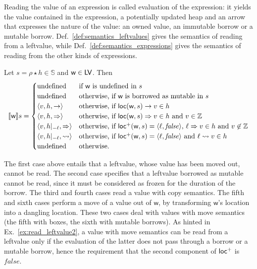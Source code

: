 Reading the value of an expression is called evaluation of the expression: it
yields the value contained in the expression, a potentially updated heap
and an arrow that expresses the nature of the value: an owned value, an immutable borrow
or a mutable borrow. Def.~\ref{def:semantics_leftvalues} gives the semantics of reading from
a leftvalue, while Def.~\ref{def:semantics_expressions} gives the semantics of reading from the other
kinds of expressions.

\begin{definition}\label{def:semantics_leftvalues}
  Let $s=\rho\star h\in\mathbb{S}$ and $\mathsf{w}\in\Leftvalues$. Then
  \[
  \den[\mathsf{w}]{s}=\begin{cases}
  \text{undefined} & \text{if $\mathsf{w}$ is undefined in $s$}\\
  \text{undefined} & \text{otherwise, if $\mathsf{w}$ is borrowed as mutable in $s$}\\
  \langle v, h, \to\rangle & \text{otherwise, if $\loc(\mathsf{w},s)\to v\in h$}\\
  \langle v, h, \Rightarrow\rangle & \text{otherwise, if $\loc(\mathsf{w},s)\Rightarrow v\in h$ and $v\in\mathbb{Z}$}\\
  \langle v, h|_{-\ell}, \Rightarrow\rangle & \text{otherwise, if $\locread(\mathsf{w},s)=\langle\ell,\mathit{false}\rangle$, $\ell\Rightarrow v\in h$ and $v\not\in\mathbb{Z}$}\\
  \langle v, h|_{-\ell}, \leadsto\rangle & \text{otherwise, if $\locread(\mathsf{w},s)=\langle\ell,\mathit{false}\rangle$ and $\ell\leadsto v\in h$}\\
  \text{undefined} & \text{otherwise.}
  \end{cases}
  \]
\end{definition}

\noindent
The first case above entails that a leftvalue, whose value has been moved out, cannot be read.
The second case specifies that a leftvalue borrowed as mutable cannot be read,
since it must be considered as frozen for the duration of the borrow.
The third and fourth cases read a value with copy semantics.
The fifth and sixth cases perform a move of a value out of $\mathsf{w}$, by transforming
$\mathsf{w}$'s location into a dangling location. These two cases deal with
values with move semantics (the fifth with boxes, the sixth with mutable borrows).
As hinted in Ex.~\ref{ex:read_leftvalue2}, a value with move semantics can be read from a leftvalue
only if the evaluation of the latter does not pass through a borrow or a mutable borrow, hence the
requirement that the second component of $\locread$ is $\mathit{false}$.

